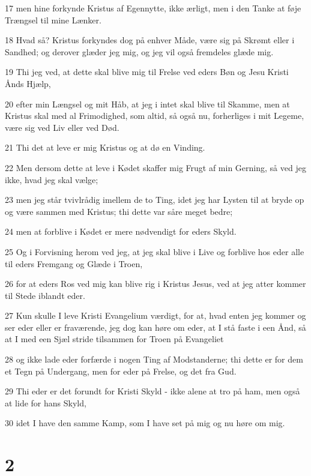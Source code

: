 \par 17 men hine forkynde Kristus af Egennytte, ikke ærligt, men i den Tanke at føje Trængsel til mine Lænker.
\par 18 Hvad så? Kristus forkyndes dog på enhver Måde, være sig på Skrømt eller i Sandhed; og derover glæder jeg mig, og jeg vil også fremdeles glæde mig.
\par 19 Thi jeg ved, at dette skal blive mig til Frelse ved eders Bøn og Jesu Kristi Ånds Hjælp,
\par 20 efter min Længsel og mit Håb, at jeg i intet skal blive til Skamme, men at Kristus skal med al Frimodighed, som altid, så også nu, forherliges i mit Legeme, være sig ved Liv eller ved Død.
\par 21 Thi det at leve er mig Kristus og at dø en Vinding.
\par 22 Men dersom dette at leve i Kødet skaffer mig Frugt af min Gerning, så ved jeg ikke, hvad jeg skal vælge;
\par 23 men jeg står tvivlrådig imellem de to Ting, idet jeg har Lysten til at bryde op og være sammen med Kristus; thi dette var såre meget bedre;
\par 24 men at forblive i Kødet er mere nødvendigt for eders Skyld.
\par 25 Og i Forvisning herom ved jeg, at jeg skal blive i Live og forblive hos eder alle til eders Fremgang og Glæde i Troen,
\par 26 for at eders Ros ved mig kan blive rig i Kristus Jesus, ved at jeg atter kommer til Stede iblandt eder.
\par 27 Kun skulle I leve Kristi Evangelium værdigt, for at, hvad enten jeg kommer og ser eder eller er fraværende, jeg dog kan høre om eder, at I stå faste i een Ånd, så at I med een Sjæl stride tilsammen for Troen på Evangeliet
\par 28 og ikke lade eder forfærde i nogen Ting af Modstanderne; thi dette er for dem et Tegn på Undergang, men for eder på Frelse, og det fra Gud.
\par 29 Thi eder er det forundt for Kristi Skyld - ikke alene at tro på ham, men også at lide for hans Skyld,
\par 30 idet I have den samme Kamp, som I have set på mig og nu høre om mig.

\chapter{2}

